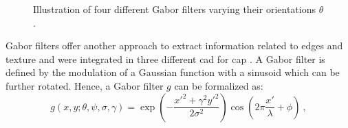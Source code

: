\begin{figure}
	\hspace*{\fill}
		 \hfill
		 \hfill
		 \hfill
	\hspace*{\fill}
	\caption[Illustration of four different Gabor filters.]{Illustration of four different Gabor filters varying their orientations $\theta$.}
	\label{fig:gabor}
\end{figure}

Gabor filters \cite{Gabor1946,Daugman1985} offer another approach to extract information related to edges and texture and were integrated in three different \ac{cad} for \ac{cap} \cite{Viswanath2008a,Viswanath2012,Tiwari2012}.
A Gabor filter is defined by the modulation of a Gaussian function with a sinusoid which can be further rotated.
Hence, a Gabor filter $g$ can be formalized as:
\begin{equation}
	g(x,y;\theta,\psi,\sigma,\gamma) = \exp \left( - \frac{x'^{2}+ \gamma^{2}y'^{2}}{2 \sigma^{2}} \right) \cos \left( 2 \pi \frac{x'}{\lambda} + \phi \right) \ ,
\end{equation}

